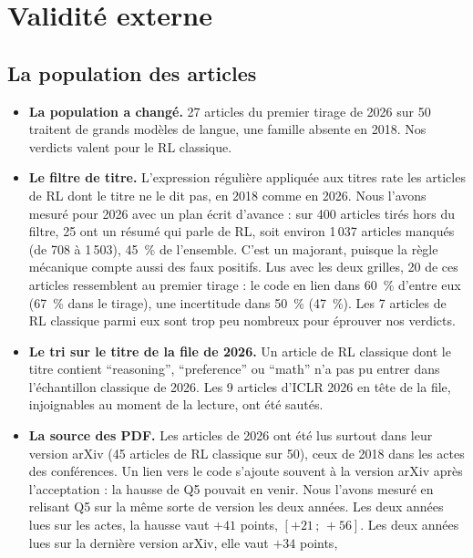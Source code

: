 \section{Validité externe}
\label{sec:val-externe}

\subsection{La population des articles}

\begin{itemize}
  \item \textbf{La population a changé.} 27 articles du premier tirage de 2026 sur 50 traitent de
        grands modèles de langue, une famille absente en 2018. Nos verdicts valent pour le RL
        classique.
  \item \textbf{Le filtre de titre.} L'expression régulière appliquée aux titres rate les articles
        de RL dont le titre ne le dit pas, en 2018 comme en 2026. Nous l'avons mesuré pour 2026 avec un
        plan écrit d'avance : sur 400 articles tirés hors du filtre, 25 ont un résumé qui
        parle de RL, soit environ 1\,037 articles manqués (de 708 à 1\,503), 45~\% de l'ensemble.
        C'est un majorant, puisque la règle mécanique compte aussi des faux positifs. Lus avec les
        deux grilles, 20 de ces articles ressemblent au premier tirage : le code en lien dans 60~\%
        d'entre eux (67~\% dans le tirage), une incertitude dans 50~\% (47~\%). Les 7 articles de RL
        classique parmi eux sont trop peu nombreux pour éprouver nos verdicts.
  \item \textbf{Le tri sur le titre de la file de 2026.} Un article de RL classique dont le titre
        contient \enquote{reasoning}, \enquote{preference} ou \enquote{math} n'a pas pu entrer dans
        l'échantillon classique de 2026. Les 9 articles d'ICLR 2026 en tête de la file, injoignables
        au moment de la lecture, ont été sautés.
  \item \textbf{La source des PDF.} Les articles de 2026 ont été lus surtout dans leur version arXiv
        (45 articles de RL classique sur 50), ceux de 2018 dans les actes des conférences. Un lien
        vers le code s'ajoute souvent à la version arXiv après l'acceptation : la hausse de Q5
        pouvait en venir. Nous l'avons mesuré en relisant Q5 sur la même sorte de version les deux
        années. Les deux années lues sur les actes, la hausse vaut $+41$ points,
        $[+21\,;\,+56]$. Les deux années lues sur la dernière version arXiv, elle vaut $+34$ points,

\end{itemize}
